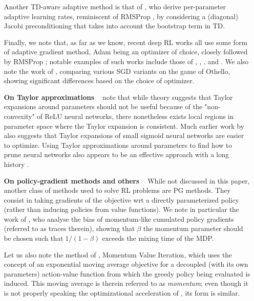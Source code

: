 Another TD-aware adaptive method is that of \citet{romoff2020tdprop}, who derive per-parameter adaptive learning rates, reminiscent of RMSProp \citep{hinton2012neural}, by considering a (diagonal) Jacobi preconditioning that takes into account the bootstrap term in TD. 

Finally, we note that, as far as we know, recent deep RL works all use some form of adaptive gradient method, Adam \citep{kingma2015adam} being an optimizer of choice, closely followed by RMSProp \citep{hinton2012neural}; notable examples of such works include those of \citet{mnih2013playing}, \citet{schulman2017proximal}, \citet{hessel2018rainbow}, and \citet{kapturowski2018recurrent}. We also note the work of \citet{sarigul2018performance}, comparing various SGD variants on the game of Othello, showing significant differences based on the choice of optimizer.

\textbf{On Taylor approximations} $\;\;$ \citet{balduzzi2017neural} note that while theory suggests that Taylor expansions around parameters should not be useful because of the "non-convexity" of ReLU neural networks, there nonetheless exists local regions in parameter space where the Taylor expansion is consistent. Much earlier work by \citet{engelbrecht2000using} also suggests that Taylor expansions of small sigmoid neural networks are easier to optimize. 
Using Taylor approximations around parameters to find how to prune neural networks also appears to be an effective approach with a long history \citep{lecun1990optimal,hassibi1993second,engelbrecht2001pruning,molchanov2016pruning}.


\textbf{On policy-gradient methods and others} $\;\;$ While not discussed in this paper, another class of methods used to solve RL problems are PG methods. They consist in taking gradients of the objective wrt a directly parameterized policy (rather than inducing policies from value functions). We note in particular the work of \citet{baxter2001infinite}, who analyse the bias of momentum-like cumulated policy gradients (referred to as traces therein), showing that $\beta$ the momentum parameter should be chosen such that $1/(1-\beta)$ exceeds the mixing time of the MDP.

Let us also note the method of \citet{vieillard2020momentum}, Momentum Value Iteration, which uses the concept of an exponential moving average objective for a decoupled (with its own parameters) action-value function from which the greedy policy being evaluated is induced. This moving average is therein referred to as \emph{momentum}; even though it is not properly speaking the optimizational acceleration of \citet{polyak1964some}, its form is similar.



